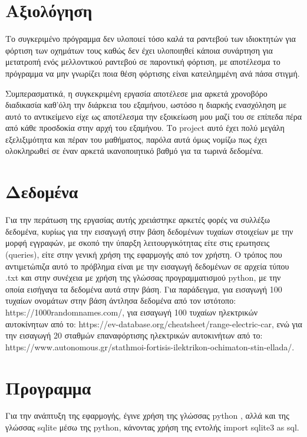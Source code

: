 \documentclass[manuscript,screen,review]{acmart}
\newcommand{\en}[1]{\foreignlanguage{english}{#1}}
\begin{document}
\newpage

\section {Αξιολόγηση}

Το συγκεριμένο πρόγραμμα δεν υλοποιεί τόσο καλά τα ραντεβού των ιδιοκτητών για φόρτιση των οχημάτων 
τους καθώς δεν έχει υλοποιηθεί κάποια συνάρτηση για μετατροπή ενός μελλοντικού ραντεβού σε παροντική 
φόρτιση, με αποτέλεσμα το πρόγραμμα να μην γνωρίζει ποια θέση φόρτισης είναι κατειλημμένη ανά πάσα στιγμή.

Συμπερασματικά, η συγκεκριμένη εργασία αποτέλεσε μια αρκετά χρονοβόρο διαδικασία καθ'όλη την διάρκεια του εξαμήνου,
ωστόσο η διαρκής ενασχόληση με αυτό το αντικείμενο είχε ως αποτέλεσμα την εξοικείωση μου μαζί του
σε επίπεδα πέρα από κάθε προσδοκία στην αρχή του εξαμήνου. Το \en{project} αυτό έχει πολύ
μεγάλη εξελιξιμότητα και πέραν του μαθήματος, παρόλα αυτά όμως νομίζω πως έχει ολοκληρωθεί σε έναν 
αρκετά ικανοποιητικό βαθμό για τα τωρινά δεδομένα.

\section {Δεδομένα}

Για την περάτωση της εργασίας αυτής χρειάστηκε αρκετές φορές να συλλέξω δεδομένα, κυρίως για την 
εισαγωγή στην βάση δεδομένων τυχαίων στοιχείων με την μορφή εγγραφών, με σκοπό την ύπαρξη λειτουργικότητας
είτε στις ερωτησεις (\en{queries}), είτε στην γενική χρήση της εφαρμογής από τον χρήστη. Ο τρόπος που
αντιμετώπιζα αυτό το πρόβλημα είναι με την εισαγωγή δεδομένων σε αρχεία τύπου \en{.txt} και στην συνέχεια
με χρήση της γλώσσας προγραμματισμού \en{python}, με την οποία εισήγαγα τα δεδομένα αυτά στην βάση.
Για παράδειγμα, για εισαγωγή 100 τυχαίων ονομάτων στην βάση άντλησα δεδομένα από τον ιστότοπο: 
\en{https://1000randomnames.com/}, για εισαγωγή 100 τυχαίων ηλεκτρικών αυτοκίνητων από το:
\en{https://ev-database.org/cheatsheet/range-electric-car}, ενώ για την εισαγωγή 20 σταθμών 
επαναφόρτισης ηλεκτρικών αυτοκινήτων από το: 
\en{https://www.autonomous.gr/stathmoi-fortisis-ilektrikon-ochimaton-stin-ellada/}.


\section{Προγραμμα}

Για την ανάπτυξη της εφαρμογής, έγινε χρήση της γλώσσας \en{python} , αλλά και της γλώσσας \en{sqlite} μέσω
της \en{python}, κάνοντας χρήση της εντολής \en{import sqlite3 as sql}.
\end{document}
